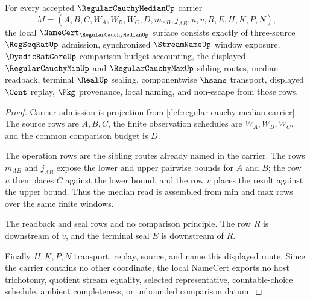 \begin{theorem}
\label{thm:regular-cauchy-median-namecert-obligations}
For every accepted $\RegularCauchyMedianUp$ carrier
$$
M=(A,B,C,W_A,W_B,W_C,D,m_{AB},j_{AB},u,v,R,E,H,K,P,N),
$$
the local $\NameCert_{\RegularCauchyMedianUp}$ surface consists exactly of three-source $\RegSeqRatUp$ admission, synchronized $\StreamNameUp$ window exposure, $\DyadicRatCoreUp$ comparison-budget accounting, the displayed $\RegularCauchyMinUp$ and $\RegularCauchyMaxUp$ sibling routes, median readback, terminal $\RealUp$ sealing, componentwise $\hsame$ transport, displayed $\Cont$ replay, $\Pkg$ provenance, local naming, and non-escape from those rows.
\end{theorem}
\begin{proof}
Carrier admission is projection from \autoref{def:regular-cauchy-median-carrier}. The source rows are $A,B,C$, the finite observation schedules are $W_A,W_B,W_C$, and the common comparison budget is $D$.

The operation rows are the sibling routes already named in the carrier. The rows $m_{AB}$ and $j_{AB}$ expose the lower and upper pairwise bounds for $A$ and $B$; the row $u$ then places $C$ against the lower bound, and the row $v$ places the result against the upper bound. Thus the median read is assembled from min and max rows over the same finite windows.

The readback and seal rows add no comparison principle. The row $R$ is downstream of $v$, and the terminal seal $E$ is downstream of $R$.

Finally $H,K,P,N$ transport, replay, source, and name this displayed route. Since the carrier contains no other coordinate, the local NameCert exports no host trichotomy, quotient stream equality, selected representative, countable-choice schedule, ambient completeness, or unbounded comparison datum.
\end{proof}

